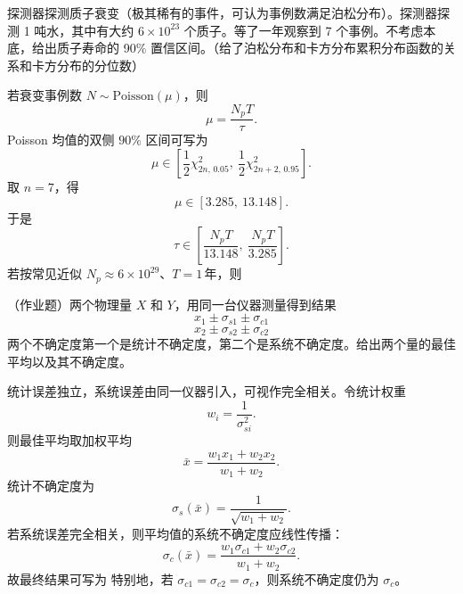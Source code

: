 \begin{question}
探测器探测质子衰变（极其稀有的事件，可认为事例数满足泊松分布）。探测器探测 1 吨水，其中有大约 $6\times 10^{23}$ 个质子。等了一年观察到 7 个事例。不考虑本底，给出质子寿命的 90\% 置信区间。（给了泊松分布和卡方分布累积分布函数的关系和卡方分布的分位数）
\begin{solution}
若衰变事例数 $N\sim \mathrm{Poisson}(\mu)$，则
\[
\mu=\frac{N_pT}{\tau}.
\]
Poisson 均值的双侧 $90\%$ 区间可写为
\[
\mu\in\left[\frac12\chi^2_{2n,\,0.05},\ \frac12\chi^2_{2n+2,\,0.95}\right].
\]
取 $n=7$，得
\[
\mu\in[3.285,\ 13.148].
\]
于是
\[
\tau\in\left[\frac{N_pT}{13.148},\ \frac{N_pT}{3.285}\right].
\]
若按常见近似 $N_p\approx 6\times 10^{29}$、$T=1\,$年，则
\end{solution}
\end{question}

\begin{question}
（作业题）两个物理量 $X$ 和 $Y$，用同一台仪器测量得到结果
\[
x_1\pm\sigma_{s1}\pm\sigma_{c1}
\]
\[
x_2\pm\sigma_{s2}\pm\sigma_{c2}
\]
两个不确定度第一个是统计不确定度，第二个是系统不确定度。给出两个量的最佳平均以及其不确定度。
\begin{solution}
统计误差独立，系统误差由同一仪器引入，可视作完全相关。令统计权重
\[
w_i=\frac{1}{\sigma_{si}^2}.
\]
则最佳平均取加权平均
\[
\bar x=\frac{w_1x_1+w_2x_2}{w_1+w_2}.
\]
统计不确定度为
\[
\sigma_s(\bar x)=\frac{1}{\sqrt{w_1+w_2}}.
\]
若系统误差完全相关，则平均值的系统不确定度应线性传播：
\[
\sigma_c(\bar x)=\frac{w_1\sigma_{c1}+w_2\sigma_{c2}}{w_1+w_2}.
\]
故最终结果可写为
特别地，若 $\sigma_{c1}=\sigma_{c2}=\sigma_c$，则系统不确定度仍为 $\sigma_c$。

\end{solution}
\end{question}


